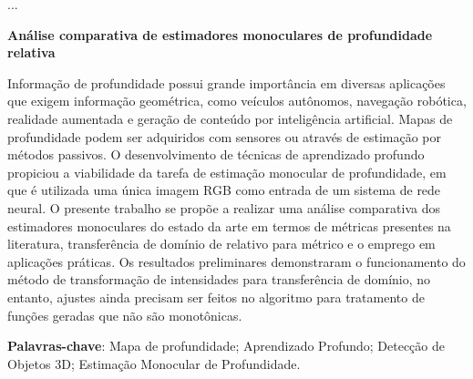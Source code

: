 	...
	
	\begin{resumo}
	
	  \begin{center}{
	    \textbf{Análise comparativa de estimadores monoculares de profundidade relativa}}
	  \end{center}
	
	\begin{spacing}{1.0}
		Informação de profundidade possui grande importância em diversas aplicações que exigem informação geométrica, como veículos autônomos, navegação robótica, realidade aumentada e geração de conteúdo por inteligência artificial. Mapas de profundidade podem ser adquiridos com sensores ou através de estimação por métodos passivos. O desenvolvimento de técnicas de aprendizado profundo propiciou a viabilidade da tarefa de estimação monocular de profundidade, em que é utilizada uma única imagem RGB como entrada de um sistema de rede neural. O presente trabalho se propõe a realizar uma análise comparativa dos estimadores monoculares do estado da arte em termos de métricas presentes na literatura, transferência de domínio de relativo para métrico e o emprego em aplicações práticas. Os resultados preliminares demonstraram o funcionamento do método de transformação de intensidades para transferência de domínio, no entanto, ajustes ainda precisam ser feitos no algoritmo para tratamento de funções geradas que não são monotônicas.
	\end{spacing}
	{\hspace{-8mm} \bf{Palavras-chave}}: Mapa de profundidade; Aprendizado Profundo; Detecção de Objetos 3D; Estimação Monocular de Profundidade.
	
	\end{resumo}
	
